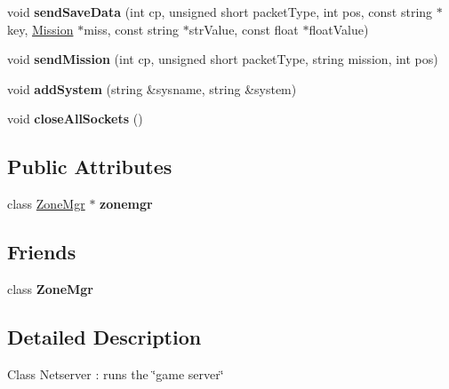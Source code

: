 \begin{DoxyCompactItemize}
\item 
void {\bfseries send\+Save\+Data} (int cp, unsigned short packet\+Type, int pos, const string $\ast$key, \hyperlink{classMission}{Mission} $\ast$miss, const string $\ast$str\+Value, const float $\ast$float\+Value)\hypertarget{classNetServer_ab10c9e11bf008ecd80e8bce9d1c81c6f}{}\label{classNetServer_ab10c9e11bf008ecd80e8bce9d1c81c6f}

\item 
void {\bfseries send\+Mission} (int cp, unsigned short packet\+Type, string mission, int pos)\hypertarget{classNetServer_a038cefd35694c26d4056198a7d86d4a9}{}\label{classNetServer_a038cefd35694c26d4056198a7d86d4a9}

\item 
void {\bfseries add\+System} (string \&sysname, string \&system)\hypertarget{classNetServer_abeefd290d2f417a0c46a211e547a7143}{}\label{classNetServer_abeefd290d2f417a0c46a211e547a7143}

\item 
void {\bfseries close\+All\+Sockets} ()\hypertarget{classNetServer_a04af589f4c654fd17569e676b4d17762}{}\label{classNetServer_a04af589f4c654fd17569e676b4d17762}

\end{DoxyCompactItemize}
\subsection*{Public Attributes}
\begin{DoxyCompactItemize}
\item 
class \hyperlink{classZoneMgr}{Zone\+Mgr} $\ast$ {\bfseries zonemgr}\hypertarget{classNetServer_a4b2ac4a951b6174796e05ad99b800e02}{}\label{classNetServer_a4b2ac4a951b6174796e05ad99b800e02}

\end{DoxyCompactItemize}
\subsection*{Friends}
\begin{DoxyCompactItemize}
\item 
class {\bfseries Zone\+Mgr}\hypertarget{classNetServer_ae0e24ddfa25f21ca918d843acdb8d513}{}\label{classNetServer_ae0e24ddfa25f21ca918d843acdb8d513}

\end{DoxyCompactItemize}


\subsection{Detailed Description}
Class Netserver \+: runs the \char`\"{}game server\char`\"{} 


